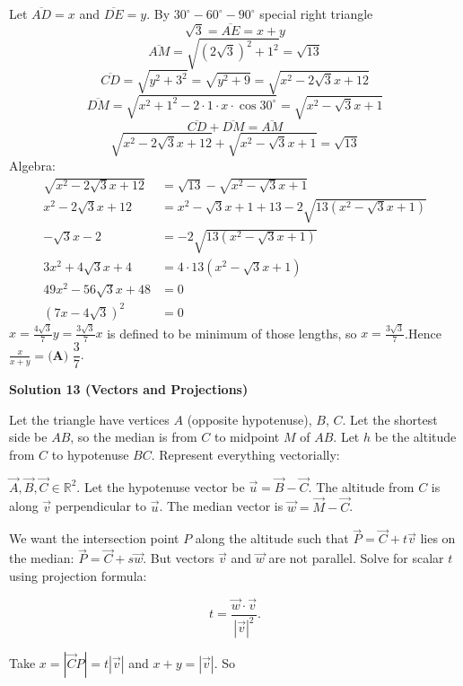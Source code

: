 \begin{enumerate}
 Let $\overline{AD} = x$ and $\overline{DE} = y$. By $30^\circ - 60^\circ - 90^\circ$ special right triangle
 \[\sqrt{3} = \overline{AE} = x + y\]
 \[\overline{AM} = \sqrt{(2\sqrt{3})^2 + 1^2} = \sqrt{13}\]
 \[\overline{CD} = \sqrt{y^2 + 3^2} = \sqrt{y^2 + 9} = \sqrt{x^2 - 2\sqrt{3}x + 12}\]
 \[\overline{DM} = \sqrt{x^2 + 1^2 - 2 \cdot 1 \cdot x \cdot \cos{30^\circ} } = \sqrt{x^2 - \sqrt{3}x + 1}\]
 \[\overline{CD} + \overline{DM} = \overline{AM}\]
 \[\sqrt{x^2 - 2\sqrt{3}x + 12} + \sqrt{x^2 - \sqrt{3}x + 1} = \sqrt{13}\]Algebra:\begin{align*}\sqrt{x^2 - 2\sqrt{3}x + 12} &= \sqrt{13} - \sqrt{x^2 - \sqrt{3}x + 1}\\x^2 - 2\sqrt{3}x + 12 &= x^2 - \sqrt{3}x + 1 + 13 - 2\sqrt{13(x^2 - \sqrt{3}x + 1)}\\-\sqrt{3}x - 2 &= -2\sqrt{13(x^2 - \sqrt{3}x + 1)}\\3x^2 + 4\sqrt{3}x + 4 &= 4\cdot13(x^2 - \sqrt{3}x + 1)\\49x^2 - 56\sqrt{3}x + 48 &= 0\\(7x-4\sqrt{3})^2 &= 0\end{align*}
$x = \frac{4\sqrt{3}}{7}$$y = \frac{3\sqrt{3}}{7}$$x$ is defined to be minimum of those lengths, so $x = \frac{3\sqrt{3}}{7}$.Hence $\frac{x}{x+y} = \boxed{\textbf{(A) } \dfrac{3}{7}}$.

 



\textbf{Solution 13 (Vectors and Projections)}

Let the triangle have vertices \( A \) (opposite hypotenuse), \( B \), \( C \). Let the shortest side be \( AB \), so the median is from \( C \) to midpoint \( M \) of \( AB \). Let \( h \) be the altitude from \( C \) to hypotenuse \( BC \). Represent everything vectorially:

 \( \vec{A}, \vec{B}, \vec{C} \in \mathbb{R}^2 \). Let the hypotenuse vector be \( \vec{u} = \vec{B} - \vec{C} \). The altitude from \( C \) is along \( \vec{v} \) perpendicular to \( \vec{u} \). The median vector is \( \vec{w} = \vec{M} - \vec{C} \).

 We want the intersection point \( P \) along the altitude such that \( \vec{P} = \vec{C} + t \vec{v} \) lies on the median: \( \vec{P} = \vec{C} + s \vec{w} \). But vectors \( \vec{v} \) and \( \vec{w} \) are not parallel. Solve for scalar \( t \) using projection formula:

 
 \[t = \frac{\vec{w} \cdot \vec{v}}{|\vec{v}|^2}.\]

 Take \( x = |\vec{C}P| = t |\vec{v}| \) and \( x + y = |\vec{v}| \). So


\end{enumerate}
